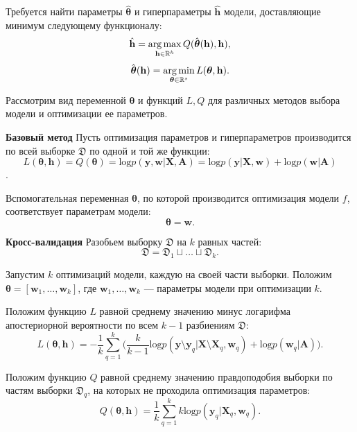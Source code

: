Требуется найти параметры $\hat{\boldsymbol{\theta}}$ и гиперпараметры $\hat{\mathbf{h}}$ модели, доставляющие минимум следующему функционалу:
\begin{equation}
\label{eq:main}
	\hat{\mathbf{h}} = \operatorname*{arg\,max}_{\mathbf{h} \in \mathbb{R}^h} Q(\hat{\boldsymbol{\theta}}(\mathbf{h}), \mathbf{h}),
\end{equation}
\begin{equation}
\label{eq:main2}
	\hat{\boldsymbol{\theta}}(\mathbf{h}) =  \operatorname*{arg\,min}_{\boldsymbol{\theta} \in \mathbb{R}^s} L(\boldsymbol{\theta}, \mathbf{h}).
\end{equation}

Рассмотрим вид переменной $\boldsymbol{\theta}$ и функций $L, Q$ для различных методов выбора модели и оптимизации ее параметров.

\textbf{Базовый метод}
Пусть оптимизация параметров и гиперпараметров производится по всей выборке $\mathfrak{D}$ по одной и той же функции:
$$L(\boldsymbol{\theta}, \mathbf{h}) = Q(\boldsymbol{\theta}) = \text{log}p(\mathbf{y}, \mathbf{w} | \mathbf{X}, \mathbf{A}) = \text{log} p(\mathbf{y}|\mathbf{X}, \mathbf{w})+\text{log}p(\mathbf{w}|\mathbf{A})$$.

Вспомогательная переменная $\boldsymbol{\theta}$, по которой производится оптимизация модели $f$,  соответствует параметрам модели: 
\[
\boldsymbol{\theta} = \mathbf{w}.
\]

\textbf{Кросс-валидация}
Разобьем выборку $\mathfrak{D}$ на $k$ равных частей:
\[
\mathfrak{D} = \mathfrak{D}_1 \sqcup \dots \sqcup \mathfrak{D}_k.
\]


Запустим $k$ оптимизаций модели, каждую на своей части выборки. Положим $\boldsymbol{\theta} = [\mathbf{w}_1, \dots, \mathbf{w}_k]$, где $\mathbf{w}_1, \dots, \mathbf{w}_k$ --- параметры модели при оптимизации $k$.
 
Положим функцию $L$ равной  среднему значению минус логарифма апостериорной вероятности по всем $k-1$ разбиениям $\mathfrak{D}$:
\begin{equation}
\label{eq:cv}
L(\boldsymbol{\theta}, \mathbf{h}) = -\frac{1}{k}\sum_{q=1}^k \bigl(\frac{k}{k-1}\text{log}p(\mathbf{y} \setminus \mathbf{y}_q|\mathbf{X}\setminus \mathbf{X}_q, \mathbf{w}_q) + \text{log}p(\mathbf{w}_q|\mathbf{A})\bigr).
\end{equation}

Положим функцию $Q$ равной среднему значению правдоподобия выборки по частям выборки $\mathfrak{D}_q$, на которых не проходила оптимизация параметров:
\[
Q(\boldsymbol{\theta}, \mathbf{h}) = \frac{1}{k}\sum_{q=1}^k k\text{log}p(\mathbf{y}_q|\mathbf{X}_q, \mathbf{w}_q).
\]


